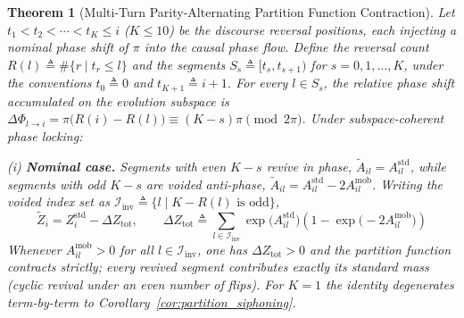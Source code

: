 \documentclass[11pt,a4paper]{article}
\newtheorem{theorem}{Theorem}
\theoremstyle{definition}
\begin{document}
\begin{theorem}[Multi-Turn Parity-Alternating Partition Function Contraction]
\label{thm:multi_turn_contraction}
Let $t_1 < t_2 < \cdots < t_K \le i$ ($K \le 10$) be the discourse reversal positions, each injecting a nominal phase shift of $\pi$ into the causal phase flow. Define the reversal count $R(l) \triangleq \#\{r \mid t_r \le l\}$ and the segments $S_s \triangleq [t_s, t_{s+1})$ for $s = 0, 1, \dots, K$, under the conventions $t_0 \triangleq 0$ and $t_{K+1} \triangleq i+1$. For every $l \in S_s$, the relative phase shift accumulated on the evolution subspace is $\Delta\Phi_{l \to i} = \pi\big(R(i) - R(l)\big) \equiv (K - s)\pi \pmod{2\pi}$. Under subspace-coherent phase locking:

(i) \textbf{Nominal case.} Segments with even $K - s$ revive in phase, $\tilde{A}_{il} = A_{il}^{\text{std}}$, while segments with odd $K - s$ are voided anti-phase, $\tilde{A}_{il} = A_{il}^{\text{std}} - 2A_{il}^{\text{mob}}$. Writing the voided index set as $\mathcal{I}_{\text{inv}} \triangleq \{l \mid K - R(l) \text{ is odd}\}$,
\begin{equation}
\tilde{Z}_i = Z_i^{\mathrm{std}} - \Delta Z_{\text{tot}}, \qquad \Delta Z_{\text{tot}} \triangleq \sum_{l \in \mathcal{I}_{\text{inv}}} \exp\big(A_{il}^{\text{std}}\big)\left(1 - \exp\big(-2A_{il}^{\text{mob}}\big)\right)
\end{equation}
Whenever $A_{il}^{\text{mob}} > 0$ for all $l \in \mathcal{I}_{\text{inv}}$, one has $\Delta Z_{\text{tot}} > 0$ and the partition function contracts strictly; every revived segment contributes exactly its standard mass (cyclic revival under an even number of flips). For $K = 1$ the identity degenerates term-by-term to Corollary~\ref{cor:partition_siphoning}.


\end{theorem}
\end{document}
